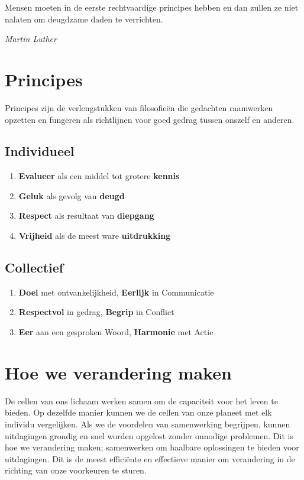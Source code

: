 \documentclass[11pt]{article}
\begin{document}
\epigraph{Mensen moeten in de eerste rechtvaardige principes hebben en dan zullen ze niet nalaten om deugdzame daden te verrichten.}{\textit{\footnotesize{Martin Luther}}}

\section{Principes}

Principes zijn de verlengstukken van filosofie\"en die gedachten raamwerken opzetten en fungeren als richtlijnen voor goed gedrag tussen onszelf en anderen.

\subsection{Individueel}

\begin{enumerate}
\item \textbf{Evalueer} als een middel tot grotere \textbf{kennis}
\item \textbf{Geluk} als gevolg van \textbf{deugd}
\item \textbf{Respect} als resultaat van \textbf{diepgang}
\item \textbf{Vrijheid} als de meest ware \textbf{uitdrukking}
\end{enumerate}

\subsection{Collectief}

\begin{enumerate}
\item \textbf{Doel} met ontvankelijkheid, \textbf{Eerlijk} in Communicatie
\item \textbf{Respectvol} in gedrag, \textbf{Begrip} in Conflict
\item \textbf{Eer} aan een gesproken Woord, \textbf{Harmonie} met Actie
\end{enumerate}

\section{Hoe we verandering maken}

De cellen van ons lichaam werken samen om de capaciteit voor het leven te bieden. Op dezelfde manier kunnen we de cellen van onze planeet met elk individu vergelijken. Als we de voordelen van samenwerking begrijpen, kunnen uitdagingen grondig en snel worden opgelost zonder onnodige problemen. Dit is hoe we verandering maken; samenwerken om haalbare oplossingen te bieden voor uitdagingen. Dit is de meest effici\"ente en effectieve manier om verandering in de richting van onze voorkeuren te sturen.\\
\end{document}
